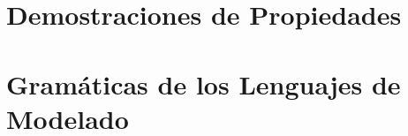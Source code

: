 \appendix 

\chapter{Demostraciones de Propiedades}\label{cap:appendix}





\chapter{Gramáticas de los Lenguajes de Modelado}\label{cap:appendix2}


